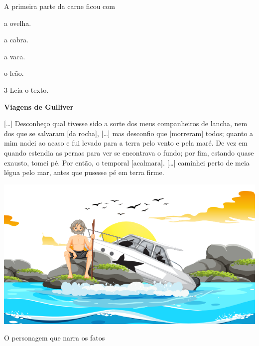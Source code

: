 A primeira parte da carne ficou com

\begin{escolha}
\begin{multicols}
\item a ovelha.

\item a cabra.

\item a vaca.

\item o leão.
\end{multicols}
\end{escolha}

\num{3} Leia o texto.

\begin{myquote}
\textbf{Viagens de Gulliver}

{[}\ldots{}{]} Desconheço qual tivesse sido a sorte dos meus
companheiros de lancha, nem dos que se salvaram [da rocha],
{[}\ldots{}{]} mas desconfio que [morreram] todos; quanto a mim nadei ao
acaso e fui levado para a terra pelo vento e pela maré. De vez em quando
estendia as pernas para ver se encontrava o fundo; por fim, estando
quase exausto, tomei pé. Por então, o temporal [acalmara]. {[}\ldots{}{]}
caminhei perto de meia légua pelo mar, antes que pusesse pé em terra
firme.

\begin{center}
\includegraphics[width=\textwidth]{./media/image23f.png}
\end{center}

\end{myquote}

O personagem que narra os fatos

